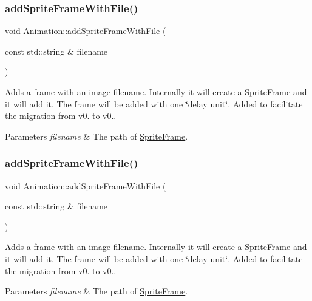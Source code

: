 \subsubsection{\texorpdfstring{add\+Sprite\+Frame\+With\+File()}{addSpriteFrameWithFile()}\hspace{0.1cm}{\footnotesize\ttfamily [1/2]}}
{\footnotesize\ttfamily void Animation\+::add\+Sprite\+Frame\+With\+File (\begin{DoxyParamCaption}\item[{const std\+::string \&}]{filename }\end{DoxyParamCaption})}

Adds a frame with an image filename. Internally it will create a \hyperlink{classSpriteFrame}{Sprite\+Frame} and it will add it. The frame will be added with one \char`\"{}delay unit\char`\"{}. Added to facilitate the migration from v0. to v0.. 
\begin{DoxyParams}{Parameters}
{\em filename} & The path of \hyperlink{classSpriteFrame}{Sprite\+Frame}. \\
\hline
\end{DoxyParams}
\mbox{\label{classAnimation_ab57ae7ddaf2adca5d944d931e892d203}} 
\subsubsection{\texorpdfstring{add\+Sprite\+Frame\+With\+File()}{addSpriteFrameWithFile()}\hspace{0.1cm}{\footnotesize\ttfamily [2/2]}}
{\footnotesize\ttfamily void Animation\+::add\+Sprite\+Frame\+With\+File (\begin{DoxyParamCaption}\item[{const std\+::string \&}]{filename }\end{DoxyParamCaption})}

Adds a frame with an image filename. Internally it will create a \hyperlink{classSpriteFrame}{Sprite\+Frame} and it will add it. The frame will be added with one \char`\"{}delay unit\char`\"{}. Added to facilitate the migration from v0. to v0.. 
\begin{DoxyParams}{Parameters}
{\em filename} & The path of \hyperlink{classSpriteFrame}{Sprite\+Frame}. \\
\hline
\end{DoxyParams}
\mbox{\label{classAnimation_a26bbe80cf512690329b5c50f7dc567e8}} 

